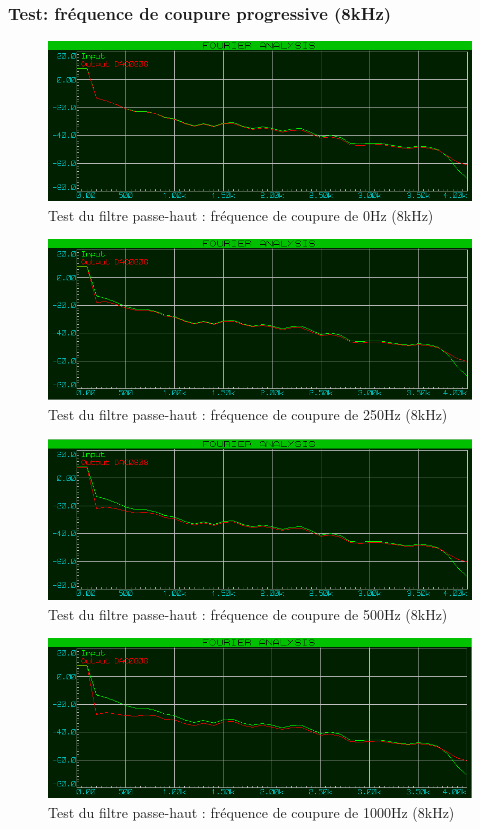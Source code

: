 \documentclass{article}
\begin{document}
    \subsubsection{Test: fréquence de coupure progressive (8kHz)}
    \begin{figure}[H]
        \centering
        \includegraphics[width=.75\textwidth]{./images/spectrum_high_pass_0_8k.png}
        \caption{Test du filtre passe-haut : fréquence de coupure de 0Hz (8kHz)}
    \end{figure}
    \begin{figure}[H]
        \centering
        \includegraphics[width=.75\textwidth]{./images/spectrum_high_pass_250_8k.png}
        \caption{Test du filtre passe-haut : fréquence de coupure de 250Hz (8kHz)}
    \end{figure}
    \begin{figure}[H]
        \centering
        \includegraphics[width=.75\textwidth]{./images/spectrum_high_pass_500_8k.png}
        \caption{Test du filtre passe-haut : fréquence de coupure de 500Hz (8kHz)}
    \end{figure}
    \begin{figure}[H]
        \centering
        \includegraphics[width=.75\textwidth]{./images/spectrum_high_pass_1000_8k.png}
        \caption{Test du filtre passe-haut : fréquence de coupure de 1000Hz (8kHz)}
    \end{figure}
\end{document}
